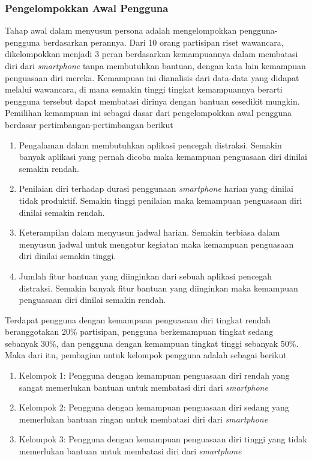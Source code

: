 \subsubsection{Pengelompokkan Awal Pengguna}
\label{subsubsec:pengelompokkan_pengguna}
Tahap awal dalam menyusun persona adalah mengelompokkan pengguna-pengguna berdasarkan perannya. Dari 10 orang partisipan riset wawancara, dikelompokkan menjadi 3 peran berdasarkan kemampuannya dalam membatasi diri dari \textit{smartphone} tanpa membutuhkan bantuan, dengan kata lain kemampuan penguasaan diri mereka. Kemampuan ini dianalisis dari data-data yang didapat melalui wawancara, di mana semakin tinggi tingkat kemampuannya berarti pengguna tersebut dapat membatasi dirinya dengan bantuan sesedikit mungkin. Pemilihan kemampuan ini sebagai dasar dari pengelompokkan awal pengguna berdasar pertimbangan-pertimbangan berikut

\begin{enumerate}
  \item Pengalaman dalam membutuhkan aplikasi pencegah distraksi. Semakin banyak aplikasi yang pernah dicoba maka kemampuan penguasaan diri dinilai semakin rendah.
  \item Penilaian diri terhadap durasi penggunaan \textit{smartphone} harian yang dinilai tidak produktif. Semakin tinggi penilaian maka kemampuan penguasaan diri dinilai semakin rendah.
  \item Keterampilan dalam menyusun jadwal harian. Semakin terbiasa dalam menyusun jadwal untuk mengatur kegiatan maka kemampuan penguasaan diri dinilai semakin tinggi.
  \item Jumlah fitur bantuan yang diinginkan dari sebuah aplikasi pencegah distraksi. Semakin banyak fitur bantuan yang diinginkan maka kemampuan penguasaan diri dinilai semakin rendah.
\end{enumerate}

Terdapat pengguna dengan kemampuan penguasaan diri tingkat rendah beranggotakan 20\% partisipan, pengguna berkemampuan tingkat sedang sebanyak 30\%, dan pengguna dengan kemampuan tingkat tinggi sebanyak 50\%. Maka dari itu, pembagian untuk kelompok pengguna adalah sebagai berikut

\begin{enumerate}
  \item Kelompok 1: Pengguna dengan kemampuan penguasaan diri rendah yang sangat memerlukan bantuan untuk membatasi diri dari  \textit{smartphone} 
  \item Kelompok 2: Pengguna dengan kemampuan penguasaan diri sedang yang memerlukan bantuan ringan untuk membatasi diri dari \textit{smartphone}
  \item Kelompok 3: Pengguna dengan kemampuan penguasaan diri tinggi yang tidak memerlukan bantuan untuk membatasi diri dari \textit{smartphone}
\end{enumerate}


